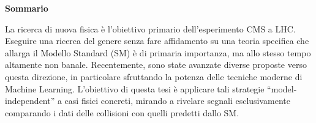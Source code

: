 \vspace{40mm}


\begin{center}
{{\large{\bf Sommario}}}
\end{center}

\begin{center}
La ricerca di nuova fisica è l'obiettivo primario dell'esperimento CMS a LHC. Eseguire una ricerca del genere senza fare affidamento su una teoria specifica che allarga il Modello Standard (SM) è di primaria importanza, ma allo stesso tempo altamente non banale. Recentemente, sono state avanzate diverse proposte verso questa direzione, in particolare sfruttando la potenza delle tecniche moderne di Machine Learning. L'obiettivo di questa tesi è applicare tali strategie ``model-independent'' a casi fisici concreti, mirando a rivelare segnali esclusivamente comparando i dati delle collisioni con quelli predetti dallo SM.
\end{center}

\endgroup
\vspace*{\fill}




\clearpage{\pagestyle{empty}\cleardoublepage}